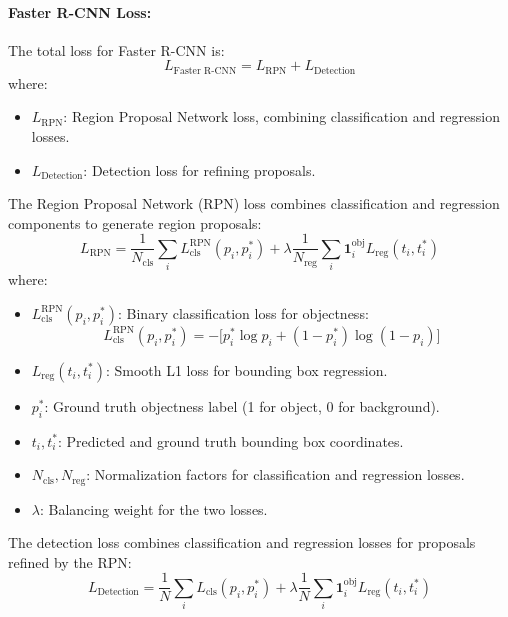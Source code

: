 \documentclass[a4paper]{article}
\begin{document}
\paragraph{Faster R-CNN Loss:}
The total loss for Faster R-CNN is:
\[
L_{\text{Faster R-CNN}} = L_{\text{RPN}} + L_{\text{Detection}}
\]
where:
\begin{itemize}
    \item \( L_{\text{RPN}} \): Region Proposal Network loss, combining classification and regression losses.
    \item \( L_{\text{Detection}} \): Detection loss for refining proposals.
\end{itemize}
The Region Proposal Network (RPN) loss combines classification and regression components to generate region proposals:
\[
L_{\text{RPN}} = \frac{1}{N_{\text{cls}}} \sum_{i} L_{\text{cls}}^{\text{RPN}}(p_i, p_i^*) + \lambda \frac{1}{N_{\text{reg}}} \sum_{i} \mathbf{1}_{i}^{\text{obj}} L_{\text{reg}}(t_i, t_i^*)
\]
where:
\begin{itemize}
    \item \( L_{\text{cls}}^{\text{RPN}}(p_i, p_i^*) \): Binary classification loss for objectness:
    \[
    L_{\text{cls}}^{\text{RPN}}(p_i, p_i^*) = - \Big[ p_i^* \log p_i + (1 - p_i^*) \log (1 - p_i) \Big]
    \]
    \item \( L_{\text{reg}}(t_i, t_i^*) \): Smooth L1 loss for bounding box regression.
    \item \( p_i^* \): Ground truth objectness label (1 for object, 0 for background).
    \item \( t_i, t_i^* \): Predicted and ground truth bounding box coordinates.
    \item \( N_{\text{cls}}, N_{\text{reg}} \): Normalization factors for classification and regression losses.
    \item \( \lambda \): Balancing weight for the two losses.
\end{itemize}

The detection loss combines classification and regression losses for proposals refined by the RPN:
\[
L_{\text{Detection}} = \frac{1}{N} \sum_{i} L_{\text{cls}}(p_i, p_i^*) + \lambda \frac{1}{N} \sum_{i} \mathbf{1}_{i}^{\text{obj}} L_{\text{reg}}(t_i, t_i^*)
\]
\end{document}
